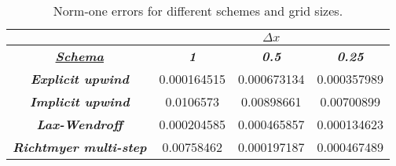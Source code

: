 	\begin{table}[]
		\centering
		\caption{Norm-one errors for different schemes and grid sizes.}
		\label{tab:gridConvergence}
		\begin{tabular}{c|c|c|c|}
			\cline{2-4}
			\textit{\textbf{}} & \multicolumn{3}{c|}{{\textit{\textbf{$\Delta x$}}}} \\ \hline
			\multicolumn{1}{|c|}{{\ul \textit{\textbf{Schema}}}} & \textit{\textbf{1}} & \textit{\textbf{0.5}} & \textit{\textbf{0.25}} \\ \hline
			\multicolumn{1}{|c|}{\textit{\textbf{Explicit upwind}}} & 0.000164515 & 0.000673134 & 0.000357989 \\ \hline
			\multicolumn{1}{|c|}{\textit{\textbf{Implicit upwind}}} & 0.0106573 & 0.00898661 & 0.00700899 \\ \hline
			\multicolumn{1}{|c|}{\textit{\textbf{Lax-Wendroff}}} & 0.000204585 & 0.000465857 & 0.000134623 \\ \hline
			\multicolumn{1}{|c|}{\textit{\textbf{Richtmyer multi-step}}} & 0.00758462 & 0.000197187 & 0.000467489 \\ \hline
		\end{tabular}
	\end{table}